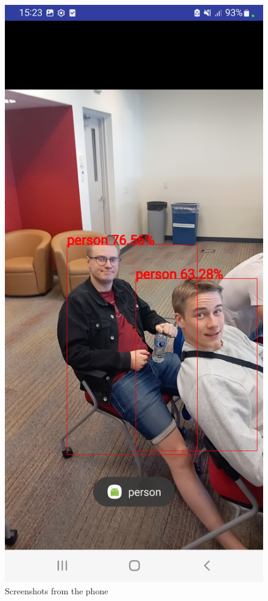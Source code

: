 \begin{figure}[H]
    \includegraphics[scale=0.15]{figure/ObjectDetection_person.jpg}
    \caption{Screenshots from the phone}
    \label{fig:Objectdetection-screenshot}
\end{figure}




